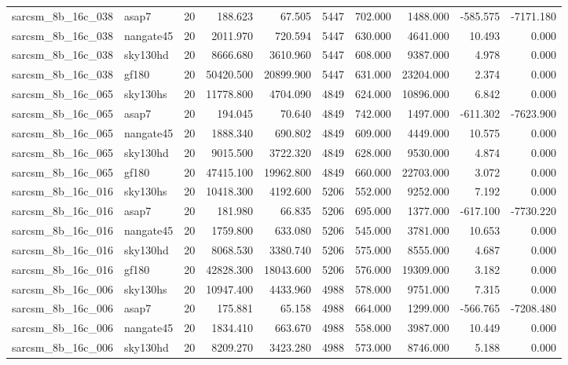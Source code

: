 \begin{tabular}{llrrrrrrrr}
sarcsm\_8b\_16c\_038 & asap7 & 20 & 188.623 & 67.505 & 5447 & 702.000 & 1488.000 & -585.575 & -7171.180 \\
sarcsm\_8b\_16c\_038 & nangate45 & 20 & 2011.970 & 720.594 & 5447 & 630.000 & 4641.000 & 10.493 & 0.000 \\
sarcsm\_8b\_16c\_038 & sky130hd & 20 & 8666.680 & 3610.960 & 5447 & 608.000 & 9387.000 & 4.978 & 0.000 \\
sarcsm\_8b\_16c\_038 & gf180 & 20 & 50420.500 & 20899.900 & 5447 & 631.000 & 23204.000 & 2.374 & 0.000 \\
sarcsm\_8b\_16c\_065 & sky130hs & 20 & 11778.800 & 4704.090 & 4849 & 624.000 & 10896.000 & 6.842 & 0.000 \\
sarcsm\_8b\_16c\_065 & asap7 & 20 & 194.045 & 70.640 & 4849 & 742.000 & 1497.000 & -611.302 & -7623.900 \\
sarcsm\_8b\_16c\_065 & nangate45 & 20 & 1888.340 & 690.802 & 4849 & 609.000 & 4449.000 & 10.575 & 0.000 \\
sarcsm\_8b\_16c\_065 & sky130hd & 20 & 9015.500 & 3722.320 & 4849 & 628.000 & 9530.000 & 4.874 & 0.000 \\
sarcsm\_8b\_16c\_065 & gf180 & 20 & 47415.100 & 19962.800 & 4849 & 660.000 & 22703.000 & 3.072 & 0.000 \\
sarcsm\_8b\_16c\_016 & sky130hs & 20 & 10418.300 & 4192.600 & 5206 & 552.000 & 9252.000 & 7.192 & 0.000 \\
sarcsm\_8b\_16c\_016 & asap7 & 20 & 181.980 & 66.835 & 5206 & 695.000 & 1377.000 & -617.100 & -7730.220 \\
sarcsm\_8b\_16c\_016 & nangate45 & 20 & 1759.800 & 633.080 & 5206 & 545.000 & 3781.000 & 10.653 & 0.000 \\
sarcsm\_8b\_16c\_016 & sky130hd & 20 & 8068.530 & 3380.740 & 5206 & 575.000 & 8555.000 & 4.687 & 0.000 \\
sarcsm\_8b\_16c\_016 & gf180 & 20 & 42828.300 & 18043.600 & 5206 & 576.000 & 19309.000 & 3.182 & 0.000 \\
sarcsm\_8b\_16c\_006 & sky130hs & 20 & 10947.400 & 4433.960 & 4988 & 578.000 & 9751.000 & 7.315 & 0.000 \\
sarcsm\_8b\_16c\_006 & asap7 & 20 & 175.881 & 65.158 & 4988 & 664.000 & 1299.000 & -566.765 & -7208.480 \\
sarcsm\_8b\_16c\_006 & nangate45 & 20 & 1834.410 & 663.670 & 4988 & 558.000 & 3987.000 & 10.449 & 0.000 \\
sarcsm\_8b\_16c\_006 & sky130hd & 20 & 8209.270 & 3423.280 & 4988 & 573.000 & 8746.000 & 5.188 & 0.000 \\

\end{tabular}
